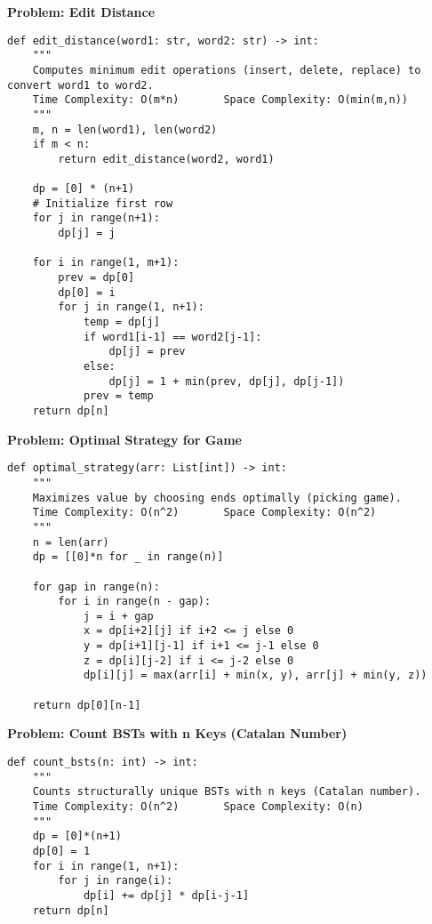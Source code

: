 \noindent\textbf{Problem: Edit Distance}
\begin{verbatim}
def edit_distance(word1: str, word2: str) -> int:
    """
    Computes minimum edit operations (insert, delete, replace) to convert word1 to word2.
    Time Complexity: O(m*n)       Space Complexity: O(min(m,n))
    """
    m, n = len(word1), len(word2)
    if m < n:
        return edit_distance(word2, word1)
    
    dp = [0] * (n+1)
    # Initialize first row
    for j in range(n+1):
        dp[j] = j
    
    for i in range(1, m+1):
        prev = dp[0]
        dp[0] = i
        for j in range(1, n+1):
            temp = dp[j]
            if word1[i-1] == word2[j-1]:
                dp[j] = prev
            else:
                dp[j] = 1 + min(prev, dp[j], dp[j-1])
            prev = temp
    return dp[n]
\end{verbatim}
\noindent\textbf{Problem: Optimal Strategy for Game}
\begin{verbatim}
def optimal_strategy(arr: List[int]) -> int:
    """
    Maximizes value by choosing ends optimally (picking game).
    Time Complexity: O(n^2)       Space Complexity: O(n^2)
    """
    n = len(arr)
    dp = [[0]*n for _ in range(n)]
    
    for gap in range(n):
        for i in range(n - gap):
            j = i + gap
            x = dp[i+2][j] if i+2 <= j else 0
            y = dp[i+1][j-1] if i+1 <= j-1 else 0
            z = dp[i][j-2] if i <= j-2 else 0
            dp[i][j] = max(arr[i] + min(x, y), arr[j] + min(y, z))
    
    return dp[0][n-1]
\end{verbatim}

\noindent\textbf{Problem: Count BSTs with n Keys (Catalan Number)}
\begin{verbatim}
def count_bsts(n: int) -> int:
    """
    Counts structurally unique BSTs with n keys (Catalan number).
    Time Complexity: O(n^2)       Space Complexity: O(n)
    """
    dp = [0]*(n+1)
    dp[0] = 1
    for i in range(1, n+1):
        for j in range(i):
            dp[i] += dp[j] * dp[i-j-1]
    return dp[n]
\end{verbatim}

